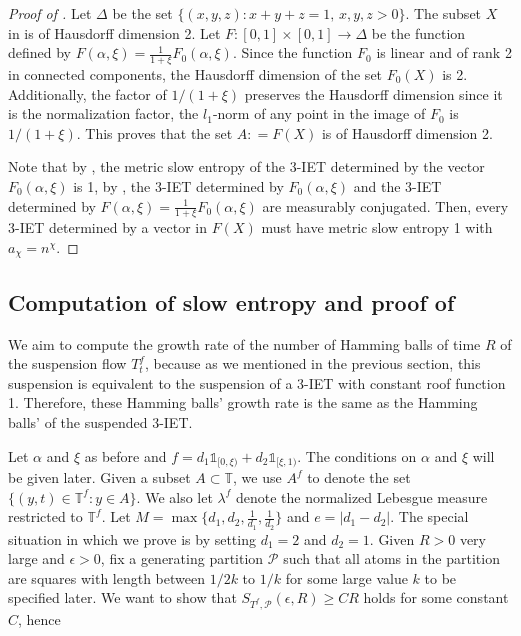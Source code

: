 \documentclass[oneside]{amsart}
\theoremstyle{plain}
\theoremstyle{definition}
\newcommand{\dfn}{\mathrel{\mathop:}=}
\newcommand{\<}{\langle}
\renewcommand{\>}{\rangle}
\renewcommand{\P}{\mathcal{P}}
\newcommand{\e}{\epsilon}
\renewcommand{\|}{|\!|} %
\begin{document}
\begin{proof}[Proof of ]
Let $\Delta$ be the set $\{(x,y,z): x+y+z=1, \, x,y,z>0\}.$
The subset $X$ in  is of Hausdorff dimension 2. Let $F:[0,1]\times[0,1] \to \Delta$ be the function defined by $F(\alpha,\xi) = \frac{1}{1+\xi}F_0(\alpha,\xi).$ Since the function $F_0$ is linear  and of rank 2 in connected components, the Hausdorff dimension of the set $F_0(X)$ is 2. Additionally, the factor of $1/(1+\xi)$ preserves the Hausdorff dimension since it is the normalization factor, the $l_1$-norm of any point in the image of $F_0$ is $1/(1+\xi).$ This proves that the set $A \dfn F(X)$ is of Hausdorff dimension 2. 

Note that by , the metric slow entropy of the 3-IET determined by the vector $F_0(\alpha,\xi)$ is 1, by , the 3-IET determined by $F_0(\alpha,\xi)$ and the 3-IET determined by $F(\alpha,\xi)=\frac{1}{1+\xi}F_0(\alpha,\xi)$ are measurably conjugated. Then, every 3-IET determined by a vector in $F(X)$ must have metric slow entropy 1 with $a_\chi = n^\chi.$
\end{proof}



\subsection{Computation of slow entropy and proof of \texorpdfstring{}{}}
\label{sec:CompSlowEntr}

We aim to compute the growth rate of the number of Hamming balls of time $R$ of the suspension flow $T^f_t$, because as we mentioned in the previous section, this suspension is equivalent to the suspension of a 3-IET with constant roof function 1.
Therefore, these Hamming balls' growth rate is the same as the Hamming balls' of the suspended 3-IET.  


Let $\alpha$ and $\xi$ as before and 
$f=d_1\mathds{1}_{[0,\xi)}+d_2\mathds{1}_{[\xi,1)}$. The
 conditions on \(\alpha\) and \(\xi\) will be given later. Given a subset $A \subset \mathbb{T}$, we use \(A^f\) to denote the set 
\(\{(y,t)\in \mathbb{T}^f: y\in A\}\). We also let
\(\lambda^f\) denote the normalized Lebesgue measure restricted to $\mathbb{T}^f$. Let \(M=\max\{d_1,d_2,\frac{1}{d_1},\frac{1}{d_2}\}\) and \(e=|d_1-d_2|.\)
The special situation in which we prove  is by setting \(d_1=2\) and \(d_2=1.\) 
Given $R>0$ very large and $\e>0$, fix a generating partition 
$\P$ such that all atoms in the partition are squares with length between \(1/2k\) to \(1/k\) for some large value \(k\) to be specified later. We want to show that $S_{T^{f},\P}(\e,R)\geq CR$ holds for some constant $C$, hence 
\end{document}
